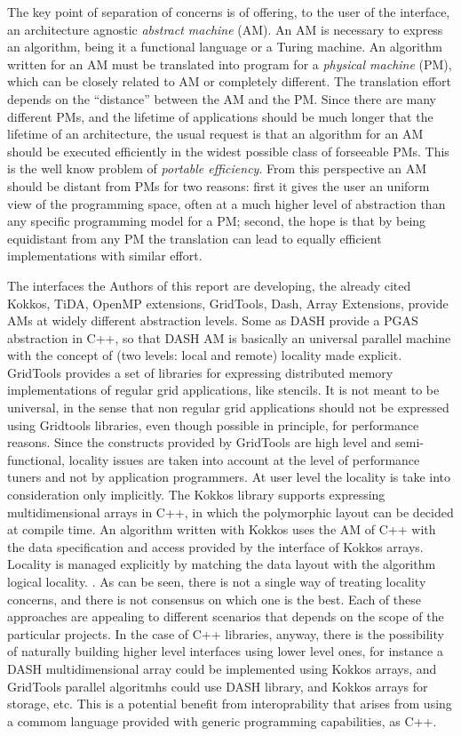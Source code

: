 The key point of separation of concerns is of offering, to the user of
the interface, an architecture agnostic {\em abstract machine}
(AM). An AM is necessary to express an algorithm, being it a
functional language or a Turing machine. An algorithm written for an
AM must be translated into program for a {\em physical machine} (PM),
which can be closely related to AM or completely different. The
translation effort depends on the ``distance'' between the AM and the
PM. Since there are many different PMs, and the lifetime of
applications should be much longer that the lifetime of an
architecture, the usual request is that an algorithm for an AM should
be executed efficiently in the widest possible class of forseeable
PMs. This is the well know problem of {\em portable efficiency}. From
this perspective an AM should be distant from PMs for two reasons:
first it gives the user an uniform view of the programming space,
often at a much higher level of abstraction than any specific
programming model for a PM; second, the hope is that by being
equidistant from any PM the translation can lead to equally efficient
implementations with similar effort.

The interfaces the Authors of this report are developing, the already
cited Kokkos, TiDA, OpenMP extensions, GridTools, Dash, Array
Extensions, provide AMs at widely different abstraction levels. Some
as DASH provide a PGAS abstraction in C++, so that DASH AM is
basically an universal parallel machine with the concept of (two
levels: local and remote) locality made explicit. GridTools provides a
set of libraries for expressing distributed memory implementations of
regular grid applications, like stencils. It is not meant to be
universal, in the sense that non regular grid applications should not
be expressed using Gridtools libraries, even though possible in
principle, for performance reasons. Since the constructs provided by
GridTools are high level and semi-functional, locality issues are
taken into account at the level of performance tuners and not by
application programmers. At user level the locality is take into
consideration only implicitly. The Kokkos library supports expressing
multidimensional arrays in C++, in which the polymorphic layout can be decided at
compile time. An algorithm written with Kokkos uses the AM of C++ with
the data specification and access provided by the interface of Kokkos
arrays. Locality is managed explicitly by matching the data layout
with the algorithm logical locality. . As can be seen, there is not a single way of treating
locality concerns, and there is not consensus on which one is the
best. Each of these approaches are appealing to different scenarios
that depends on the scope of the particular projects. In the case of
C++ libraries, anyway, there is the possibility of naturally building
higher level interfaces using lower level ones, for instance a DASH
multidimensional array could be implemented using Kokkos arrays, and
GridTools parallel algoritmhs could use DASH library, and Kokkos
arrays for storage, etc. This is a potential benefit from
interoprability that arises from using a commom language provided with
generic programming capabilities, as C++.

